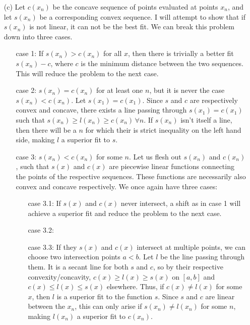 \documentclass[11pt]{article}
\theoremstyle{definition}
\begin{document}
\begin{itemize}
\begin{itemize}
            \item[(c)] Let $c(x_n)$ be the concave sequence of points evaluated at points $x_n$, and let $s(x_n)$ be a corresponding convex sequence. I will attempt to show that if $s(x_n)$ is not linear, it can not be the best fit. We can break this problem down into three cases.
                \begin{itemize}
                    \item[case 1:] If $s(x_n)>c(x_n)$ for all $x$, then there is trivially a better fit $s(x_n)-c$, where $c$ is the minimum distance between the two sequences. This will reduce the problem to the next case.
                    \item[case 2:] $s(x_n)=c(x_n)$ for at least one $n$, but it is never the case $s(x_n)<c(x_n)$. Let $s(x_1)=c(x_1)$. Since $s$ and $c$ are respectively convex and concave, there exists a line passing through $s(x_1)=c(x_1)$ such that $s(x_n)\geq l(x_n) \geq c(x_n) \, \forall n$. If $s(x_n)$ isn't itself a line, then there will be a $n$ for which their is strict inequality on the left hand side, making $l$ a superior fit to $s$.
                    \item[case 3:] $s(x_n)<c(x_n)$ for some $n$. Let us flesh
out $s(x_n)$ and $c(x_n)$, such that $s(x)$ and $c(x)$ are piecewise linear
functions connecting the points of the respective sequences. These functions
are necessarily also convex and concave respectively. We once again have three
cases:
                        \begin{itemize}
                            \item[case 3.1:] If $s(x)$ and $c(x)$ never intersect, a shift as in case 1 will achieve a superior fit and reduce the problem to the next case.
                            \item[case 3.2:]  
                            \item[case 3.3:] If they $s(x)$ and $c(x)$ intersect at multiple points, we can choose two intersection points $a<b$. Let $l$ be the line passing through them. It is a secant line for both $s$ and $c$, so by their respective convexity/concavity, $c(x)\geq l(x) \geq s(x)$ on $[a,b]$ and $c(x)\leq l(x) \leq s(x)$ elsewhere. Thus, if $c(x)\neq l(x)$ for some $x$, then $l$ is a superior fit to the function $s$. Since $s$ and $c$ are linear between the $x_n$, this can only arise if $s(x_n)\neq l(x_n)$ for some $n$, making $l(x_n)$ a superior fit to $c(x_n)$.


\end{itemize}
\end{itemize}
\end{itemize}
\end{itemize}
\end{document}
